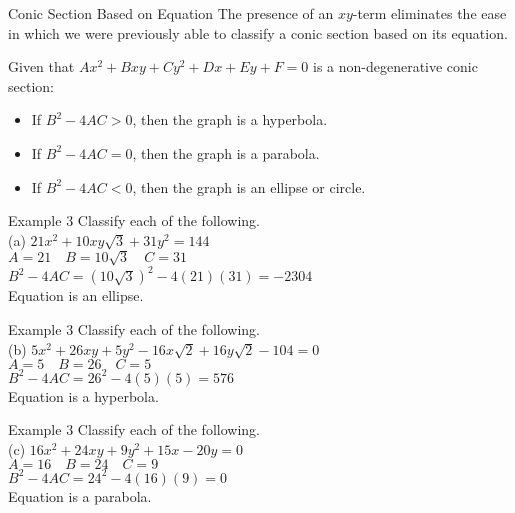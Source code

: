 \documentclass[t,usenames,dvipsnames]{beamer}
\begin{document}
\begin{frame}{Conic Section Based on Equation}
The presence of an $xy$-term eliminates the ease in which we were previously able to classify a conic section based on its equation. \newline\\  \pause

Given that $Ax^2 + Bxy + Cy^2 + Dx + Ey + F = 0$ is a non-degenerative conic section:    \newline\\  \pause
\begin{itemize}
    \item If $B^2 - 4AC > 0$, then the graph is a hyperbola.    \newline\\  \pause
    \item If $B^2 - 4AC = 0$, then the graph is a parabola.    \newline\\  \pause
    \item If $B^2 - 4AC < 0$, then the graph is an ellipse or circle.
\end{itemize}
\end{frame}

\begin{frame}{Example 3}
Classify each of the following. \newline\\
(a) \quad   $21x^2 + 10xy\sqrt{3} + 31y^2 = 144$    \newline\\  \pause
$A = 21 \quad B = 10\sqrt{3} \quad C = 31$  \newline\\  \pause
$B^2 - 4AC = (10\sqrt{3})^2 - 4(21)(31) = -2304$    \newline\\  \pause
Equation is an ellipse.
\end{frame}

\begin{frame}{Example 3}
Classify each of the following. \newline\\
(b) \quad   $5x^2 + 26xy + 5y^2 - 16x\sqrt{2} + 16y\sqrt{2} - 104 = 0$  \newline\\  \pause
$A = 5 \quad B = 26 \quad C = 5$        \newline\\  \pause
$B^2-4AC = 26^2 - 4(5)(5) = 576$        \newline\\  \pause
Equation is a hyperbola.
\end{frame}

\begin{frame}{Example 3}
Classify each of the following. \newline\\
(c) \quad   $16x^2 + 24xy + 9y^2 + 15x - 20y = 0$    \newline\\  \pause
$A = 16 \quad B = 24 \quad C = 9$    \newline\\  \pause
$B^2 - 4AC = 24^2 - 4(16)(9) = 0$    \newline\\  \pause
Equation is a parabola.
\end{frame}
\end{document}
